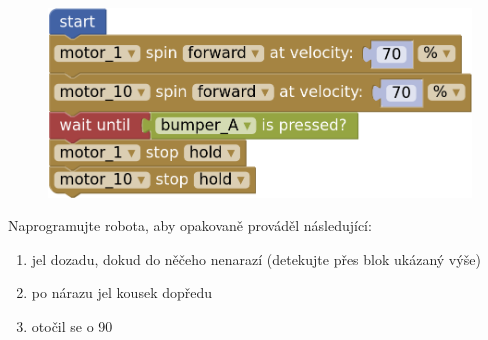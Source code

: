 \documentclass[../main.tex]{subfiles}
\begin{document}
	\begin{figure}
		\centering
		\begin{minipage}{0.5\textwidth}
			\includegraphics[width=\linewidth]{Images/02/sol7.png}
		\end{minipage}
	\end{figure}

	\begin{question}
		Naprogramujte robota, aby opakovaně prováděl následující:
		\begin{enumerate}
			\item jel dozadu, dokud do něčeho nenarazí (detekujte přes blok ukázaný výše)
			\item po nárazu jel kousek dopředu
			\item otočil se o 90\degree
		\end{enumerate}
	\end{question}
\end{document}
